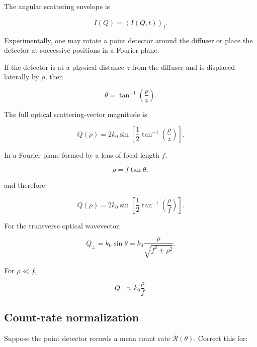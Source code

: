 \documentclass[11pt]{article}
\newcommand{\avg}[1]{\left\langle #1 \right\rangle}
\newcommand{\kopt}{k_0}
\begin{document}
The angular scattering envelope is

\begin{equation}
    \overline{I}(Q)
    =
    \avg{I(Q,t)}_t.
\end{equation}

Experimentally, one may rotate a point detector around the diffuser or place
the detector at successive positions in a Fourier plane.

If the detector is at a physical distance $z$ from the diffuser and is
displaced laterally by $\rho$, then

\begin{equation}
    \theta = \tan^{-1}\left(\frac{\rho}{z}\right).
\end{equation}

The full optical scattering-vector magnitude is

\begin{equation}
    Q(\rho)
    =
    2\kopt
    \sin\left[
        \frac{1}{2}
        \tan^{-1}\left(\frac{\rho}{z}\right)
    \right].
\end{equation}

In a Fourier plane formed by a lens of focal length $f$,

\begin{equation}
    \rho = f\tan\theta,
\end{equation}

and therefore

\begin{equation}
    Q(\rho)
    =
    2\kopt
    \sin\left[
        \frac{1}{2}
        \tan^{-1}\left(\frac{\rho}{f}\right)
    \right].
\end{equation}

For the transverse optical wavevector,

\begin{equation}
    Q_\perp
    =
    \kopt\sin\theta
    =
    \kopt\frac{\rho}{\sqrt{f^2+\rho^2}}.
\end{equation}

For $\rho\ll f$,

\begin{equation}
    Q_\perp \approx \kopt\frac{\rho}{f}.
\end{equation}

\subsection{Count-rate normalization}

Suppose the point detector records a mean count rate
$\overline{\mathcal{R}}(\theta)$. Correct this for:
\end{document}
